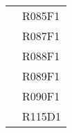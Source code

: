 \documentclass[../analisi-dei-requisiti.tex]{subfiles}
\begin{document}
\begin{longtable}[H]{>{\centering}m{5cm} >{\centering}m{5cm}}
                                & R085F1                               \\
                                & R087F1                               \\
                                & R088F1                               \\
                                & R089F1                               \\
                                & R090F1                               \\
                                & R115D1                               \\
\end{longtable}

\centering
{}
\renewcommand{\arraystretch}{2}
\end{document}
